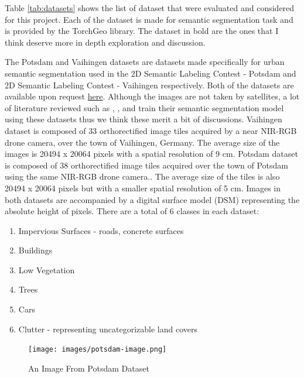 \FloatBarrier

Table \ref{tab:datasets} shows the list of dataset that were evaluated and considered for this project. Each of the dataset is made for semantic segmentation task and  is provided by the TorchGeo library. The dataset in bold are the ones that I think deserve more in depth exploration and discussion. 

The Potsdam and Vaihingen datasets \cite{potsdam-vaihingen} are datasets made specifically for urban semantic segmentation used in the 2D Semantic Labeling Contest - Potsdam and 2D Semantic Labeling Contest - Vaihingen respectively. Both of the datasets are available upon request \href{https://www.isprs.org/education/benchmarks/UrbanSemLab/detection-and-reconstruction.aspx#VaihigenDataDescr}{here}. Although the images are not taken by satellites, a lot of literature reviewed such as \cite{unetformer}, \cite{a-novel-transformer}, \cite{multi-attention-network} and \cite{A2-FPN} train their semantic segmentation model using these datasets thus we think these merit a bit of discussions. Vaihingen dataset is composed of 33 orthorectified image tiles acquired by a near NIR-RGB drone camera, over the town of Vaihingen, Germany. The average size of the images is 20494 x 20064 pixels with a spatial resolution of 9 cm. Potsdam dataset is composed of 38 orthorectified image tiles acquired  over the town of Potsdam using the same NIR-RGB drone camera.. The average size of the tiles is also 20494 x 20064 pixels but with a smaller spatial resolution of 5 cm. Images in both datasets are accompanied by a digital surface model (DSM) representing the absolute height of pixels. There are a total of 6 classes in each dataset:

\begin{enumerate}
    \item Impervious Surfaces - roads, concrete surfaces 
    \item Buildings 
    \item Low Vegetation 
    \item Trees 
    \item Cars  
    \item Clutter - representing uncategorizable land covers
\end{enumerate}

\FloatBarrier
 \begin{figure}[ht]
\texttt{[image: images/potsdam-image.png]}
\centering
\caption{An Image From Potsdam Dataset}
\label{fig:potsdam-image}
\end{figure}

